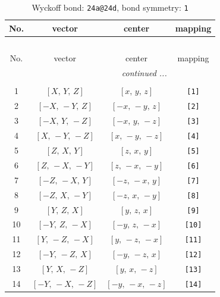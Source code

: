 \documentclass[fleqn,8pt]{jsarticle}
\begin{document}
\begin{longtable}{cccc}
\caption{Wyckoff bond: {\tt 24a@24d}, bond symmetry: {\tt 1}}
 \\
 \hline \hline
No. & vector & center & mapping \\ \hline \endfirsthead

\multicolumn{3}{l}{\tablename\ \thetable{}} \\
 \hline \hline
No. & vector & center & mapping \\ \hline \endhead

 \hline \hline
\multicolumn{3}{r}{\footnotesize\it continued ...} \\ \endfoot

 \hline \hline
\multicolumn{3}{r}{} \\ \endlastfoot

1 & $\left[ X,\, Y,\, Z \right]$ & $\left[ x,\, y,\, z \right]$ & {\tt [1]} \\ \hline
2 & $\left[ - X,\, - Y,\, Z \right]$ & $\left[ - x,\, - y,\, z \right]$ & {\tt [2]} \\ \hline
3 & $\left[ - X,\, Y,\, - Z \right]$ & $\left[ - x,\, y,\, - z \right]$ & {\tt [3]} \\ \hline
4 & $\left[ X,\, - Y,\, - Z \right]$ & $\left[ x,\, - y,\, - z \right]$ & {\tt [4]} \\ \hline
5 & $\left[ Z,\, X,\, Y \right]$ & $\left[ z,\, x,\, y \right]$ & {\tt [5]} \\ \hline
6 & $\left[ Z,\, - X,\, - Y \right]$ & $\left[ z,\, - x,\, - y \right]$ & {\tt [6]} \\ \hline
7 & $\left[ - Z,\, - X,\, Y \right]$ & $\left[ - z,\, - x,\, y \right]$ & {\tt [7]} \\ \hline
8 & $\left[ - Z,\, X,\, - Y \right]$ & $\left[ - z,\, x,\, - y \right]$ & {\tt [8]} \\ \hline
9 & $\left[ Y,\, Z,\, X \right]$ & $\left[ y,\, z,\, x \right]$ & {\tt [9]} \\ \hline
10 & $\left[ - Y,\, Z,\, - X \right]$ & $\left[ - y,\, z,\, - x \right]$ & {\tt [10]} \\ \hline
11 & $\left[ Y,\, - Z,\, - X \right]$ & $\left[ y,\, - z,\, - x \right]$ & {\tt [11]} \\ \hline
12 & $\left[ - Y,\, - Z,\, X \right]$ & $\left[ - y,\, - z,\, x \right]$ & {\tt [12]} \\ \hline
13 & $\left[ Y,\, X,\, - Z \right]$ & $\left[ y,\, x,\, - z \right]$ & {\tt [13]} \\ \hline
14 & $\left[ - Y,\, - X,\, - Z \right]$ & $\left[ - y,\, - x,\, - z \right]$ & {\tt [14]} \\ \hline

\end{longtable}
\end{document}
